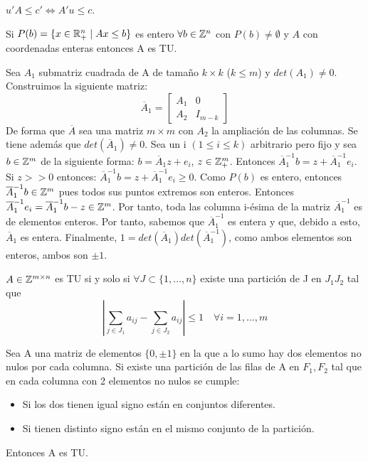 \documentclass[PM.tex]{subfiles}
\begin{document}
\begin{dem}
$u'A \leq c' \Leftrightarrow A'u \leq c$. \QED
\end{dem}
\begin{theorem}
Si $P(b)=\{x\in\mathbb{R}^n_+ \mid Ax\leq b\}$ es entero $\forall b\in\mathbb{Z}^n$ con $P(b)\neq\emptyset$ y $A$ con coordenadas enteras entonces A es TU.
\end{theorem}
\begin{dem}
Sea $A_1$ submatriz cuadrada de A de tamaño $k\times k$ ($ k \leq m$) y $det(A_1)\neq 0$. Construimos la siguiente matriz:
\[
\overline{A}_1 = 
\begin{bmatrix}
A_1 & 0\\
A_2 & I_{m-k}
\end{bmatrix}
\]
De forma que $\overline{A}$ sea una matriz $m\times m$ con $A_2$ la ampliación de las columnas. Se tiene además que $det(\overline{A}_1)\neq 0$. Sea un i $(1\leq i \leq k)$ arbitrario pero fijo y sea $b\in \mathbb{Z}^m$ de la siguiente forma: $b=\overline{A}_1 z + e_i$, $z\in\mathbb{Z}^m_+$. Entonces $\overline{A}_1^{-1}b=z+\overline{A}_1^{-1}e_i$. 
\\
Si $z>>0$ entonces: $\overline{A}_1^{-1}b = z+\overline{A}_1^{-1}e_i \geq 0$. Como $P(b)$ es entero, entonces $\overline{A}_1^{-1}b \in \mathbb{Z}^m$ pues todos sus puntos extremos son enteros. Entonces $ \overline{A}_1^{-1}e_i=\overline{A}_1^{-1}b-z\in\mathbb{Z}^m$. Por tanto, toda las columna i-ésima de la matriz $\overline{A}_1^{-1}$ es de elementos enteros. Por tanto, sabemos que $\overline{A}_1^{-1}$ es entera y que, debido a esto, $\overline{A}_1$ es entera. Finalmente, $1 = det(\overline{A}_1)det(\overline{A}_1^{-1})$, como ambos elementos son enteros, ambos son $\pm 1$. \QED
\end{dem}
\begin{theorem}
$A\in\mathbb{Z}^{m\times n}$ es TU si y solo si $\forall J\subset\{1,\dotsc,n\}$ existe una partición de J en $J_1J_2$ tal que 
\[
\left| \sum_{j\in J_1}a_{ij}-\sum_{j\in J_2}a_{ij} \right| \leq 1 \quad \forall i=1,\dotsc,m
\]
\end{theorem}
\begin{prop}\label{propo}
Sea A una matriz de elementos $\{0,\pm1\}$ en la que a lo sumo hay dos elementos no nulos por cada columna. Si existe una partición de las filas de A en $F_1,F_2$ tal que en cada columna con 2 elementos no nulos se cumple:
\begin{itemize}
\item Si los dos tienen igual signo están en conjuntos diferentes.
\item Si tienen distinto signo están en el mismo conjunto de la partición.
\end{itemize}
Entonces A es TU.
\end{prop}
\end{document}
